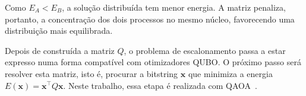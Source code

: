 Como $E_A < E_B$, a solução distribuída tem menor energia. A matriz penaliza, portanto,
a concentração dos dois processos no mesmo núcleo, favorecendo uma distribuição mais
equilibrada.

Depois de construída a matriz $Q$, o problema de escalonamento passa a estar expresso
numa forma compatível com otimizadores \acs{QUBO}. O próximo passo será resolver esta matriz, isto é, procurar a bitstring $\mathbf{x}$ que minimiza a energia $E(\mathbf{x})=\mathbf{x}^{\top}Q\mathbf{x}$. Neste trabalho, essa etapa é realizada
com \acs{QAOA}~\cite{Farhi2014QAOA}.

